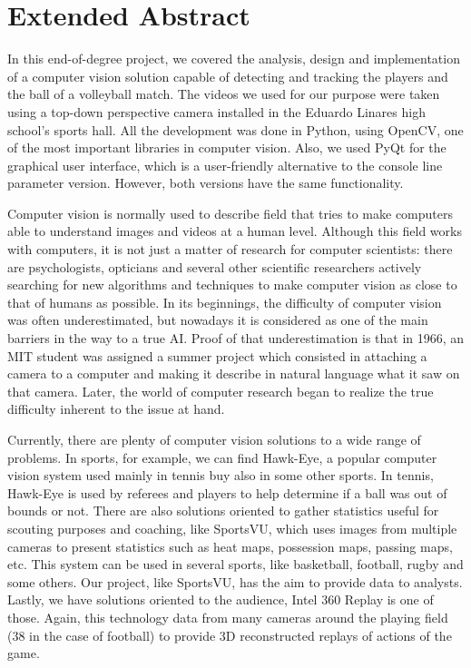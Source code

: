 \newpage
\section*{Extended Abstract}

In this end-of-degree project, we covered the analysis, design and implementation of a computer vision solution capable of detecting and tracking the players and the ball of a volleyball match. The videos we used for our purpose were taken using a top-down perspective camera installed in the Eduardo Linares high school’s sports hall. All the development was done in Python, using OpenCV, one of the most important libraries in computer vision. Also, we used PyQt for the graphical user interface, which is a user-friendly alternative to the console line parameter version. However, both versions have the same functionality. 

Computer vision is normally used to describe field that tries to make computers able to understand images and videos at a human level. Although this field works with computers, it is not just a matter of research for computer scientists: there are psychologists, opticians and several other scientific researchers actively searching for new algorithms and techniques to make computer vision as close to that of humans as possible. In its beginnings, the difficulty of computer vision was often underestimated, but nowadays it is considered as one of the main barriers in the way to a true AI. Proof of that underestimation is that in 1966, an MIT student was assigned a summer project which consisted in attaching a camera to a computer and making it describe in natural language what it saw on that camera. Later, the world of computer research began to realize the true difficulty inherent to the issue at hand.

Currently, there are plenty of computer vision solutions to a wide range of problems. In sports, for example, we can find Hawk-Eye, a popular computer vision system used mainly in tennis buy also in some other sports. In tennis, Hawk-Eye is used by referees and players to help determine if a ball was out of bounds or not. There are also solutions oriented to gather statistics useful for scouting purposes and coaching, like SportsVU, which uses images from multiple cameras to present statistics such as heat maps, possession maps, passing maps, etc. This system can be used in several sports, like basketball, football, rugby and some others. Our project, like SportsVU, has the aim to provide data to analysts. Lastly, we have solutions oriented to the audience, Intel 360 Replay is one of those. Again, this technology data from many cameras around the playing field (38 in the case of football) to provide 3D reconstructed replays of actions of the game.

